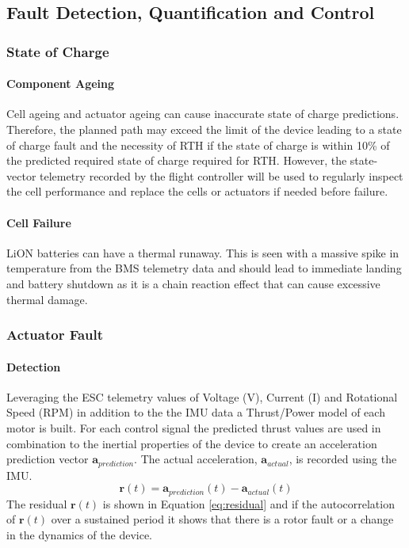 \subsection{Fault Detection, Quantification and Control}\label{sub_section:tgt_fault_detection}

\subsubsection{State of Charge}\label{sub_sub_section:tgt_SOC}
\paragraph{Component Ageing}
Cell ageing and actuator ageing can cause inaccurate state of charge predictions. Therefore, the planned path may exceed the limit of the device leading to a state of charge fault and the necessity of \gls{RTH} if the state of charge is within 10\% of the predicted required state of charge required for \gls{RTH}. However, the state-vector telemetry recorded by the flight controller will be used to regularly inspect the cell performance and replace the cells or actuators if needed before failure.
\paragraph{Cell Failure}
\gls{LiON} batteries can have a thermal runaway. This is seen with a massive spike in temperature from the \gls{BMS} telemetry data and should lead to immediate landing and battery shutdown as it is a chain reaction effect that can cause excessive thermal damage\cite{LiONRunaway}.

\subsubsection{Actuator Fault}\label{sub_sub_section:tgt_actuator_fault}
\paragraph{Detection}
Leveraging the \gls{ESC} telemetry values of Voltage (V), Current (I) and Rotational Speed (RPM) in addition to the the \gls{IMU} data a Thrust/Power model of each motor is built.
For each control signal the predicted thrust values are used in combination to the inertial properties of the device to create an acceleration prediction vector $\mathbf{a}_{prediction}$. The actual acceleration,  $\mathbf{a}_{actual}$, is recorded using the \gls{IMU}.
\begin{equation}\label{eq:residual}
    \mathbf{r}(t) = \mathbf{a}_{prediction}(t) - \mathbf{a}_{actual}(t)
\end{equation}
The residual $\mathbf{r}(t)$ is shown in Equation \ref{eq:residual} and if the autocorrelation of $\mathbf{r}(t)$ over a sustained period it shows that there is a rotor fault or a change in the dynamics of the device. 
